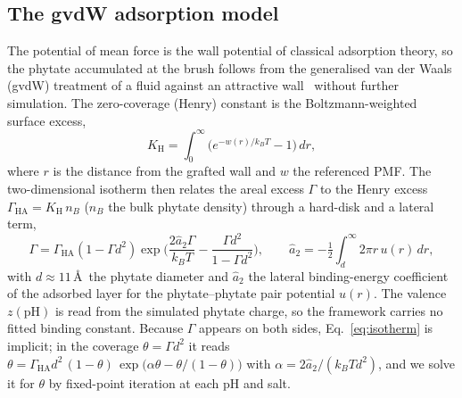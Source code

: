\documentclass[11pt]{article}
\begin{document}
\subsection{The gvdW adsorption model}

The potential of mean force is the wall potential of classical adsorption theory,
so the phytate accumulated at the brush follows from the generalised van der Waals
(gvdW) treatment of a fluid against an attractive wall~\cite{Nordholm2018} without
further simulation.  The zero-coverage (Henry) constant is the Boltzmann-weighted
surface excess,
\begin{equation}\label{eq:KH}
K_\text{H} = \int_0^\infty \big(e^{-w(r)/k_BT}-1\big)\,dr,
\end{equation}
where $r$ is the distance from the grafted wall and $w$ the referenced PMF.  The
two-dimensional isotherm then relates the areal excess $\Gamma$ to the Henry
excess $\Gamma_\text{HA}=K_\text{H}\,n_B$ ($n_B$ the bulk phytate density) through
a hard-disk and a lateral term,
\begin{equation}\label{eq:isotherm}
\Gamma = \Gamma_\text{HA}(1-\Gamma d^2)
         \exp\!\Big(\frac{2\hat a_2\Gamma}{k_BT}-\frac{\Gamma d^2}{1-\Gamma d^2}\Big),
\qquad
\hat a_2 = -\tfrac12\!\int_d^\infty\! 2\pi r\,u(r)\,dr,
\end{equation}
with $d\approx11$\,\AA\ the phytate diameter and $\hat a_2$ the lateral
binding-energy coefficient of the adsorbed layer for the phytate--phytate pair
potential $u(r)$.  The valence $z(\text{pH})$ is read from the simulated phytate
charge, so the framework carries no fitted binding constant.  Because $\Gamma$
appears on both sides, Eq.~\ref{eq:isotherm} is implicit; in the coverage
$\theta=\Gamma d^2$ it reads $\theta = \Gamma_\text{HA} d^2\,(1-\theta)\,
\exp\!\big(\alpha\theta-\theta/(1-\theta)\big)$ with $\alpha=2\hat a_2/(k_BT d^2)$,
and we solve it for $\theta$ by fixed-point iteration at each pH and salt.
\end{document}
